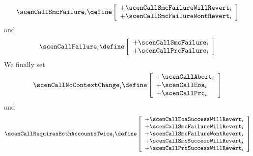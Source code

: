 \[
	\scenCallSmcFailure _{i} \define
	 \left[ \begin{array}{l}
		+ \scenCallSmcFailureWillRevert        _{i}    \\
		+ \scenCallSmcFailureWontRevert        _{i}    \\
	\end{array} \right]
\]
and
\[
	\scenCallFailure _{i} \define
	 \left[ \begin{array}{l}
 		+ \scenCallSmcFailure   _{i} \\
		+ \scenCallPrcFailure   _{i} \\
	\end{array} \right]
\]
We finally set
\[
	\scenCallNoContextChange _{i} \define
	 \left[ \begin{array}{l}
		+ \scenCallAbort                       _{i}    \\
		+ \scenCallEoa                         _{i}    \\
		+ \scenCallPrc                         _{i}    \\
	\end{array} \right]
\]
and
\[
	\scenCallRequiresBothAccountsTwice _{i} \define
	\left[ \begin{array}{l}
		+ \scenCallEoaSuccessWillRevert               _{i}    \\
		+ \scenCallSmcFailureWillRevert        _{i}    \\
		+ \scenCallSmcFailureWontRevert        _{i}    \\
		+ \scenCallSmcSuccessWillRevert        _{i}    \\
		+ \scenCallPrcSuccessWillRevert        _{i}    \\
	\end{array} \right]
\]
